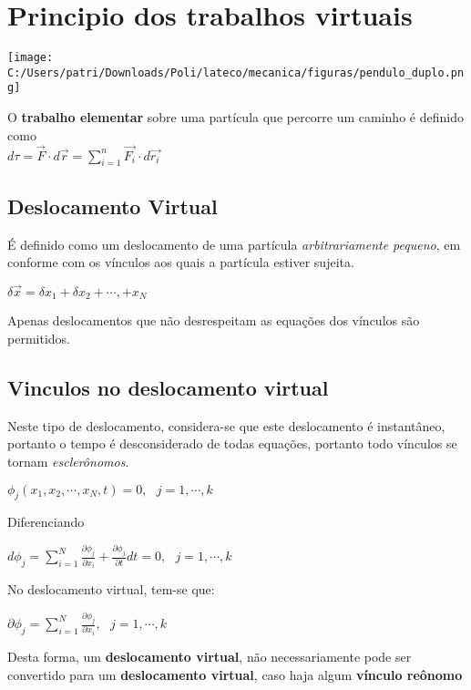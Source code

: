 \section{Principio dos trabalhos virtuais}

\begin{center}
\texttt{[image: C:/Users/patri/Downloads/Poli/lateco/mecanica/figuras/pendulo\_duplo.png]}
\end{center}

\begin{namedtheorem}
O \textbf{trabalho elementar} sobre uma partícula que percorre um caminho é definido como \\
$d\tau = \vec{F}\cdot d\vec{r} = \sum_{i=1}^n \vec{F_i}\cdot d\vec{r_i}$
\end{namedtheorem}

\subsection{Deslocamento Virtual}

É definido como um deslocamento de uma partícula \textit{arbitrariamente pequeno}, em conforme com os vínculos aos quais a partícula estiver sujeita. 

$\delta \vec{x} = \delta x_1 + \delta x_2 + \cdots, + x_N$

Apenas deslocamentos que não desrespeitam as equações dos vínculos são permitidos.


\subsection{Vinculos no deslocamento virtual}

Neste tipo de deslocamento, considera-se que este deslocamento é instantâneo, portanto o tempo é desconsiderado de todas equações, portanto todo vínculos se tornam \textit{esclerônomos}.

$\phi_j(x_1, x_2, \cdots, x_{N}, t) = 0, \textit{  } j =1, \cdots, k$

Diferenciando

$d \phi_j = \sum_{i=1}^{N} \frac{\partial \phi_j}{\partial x_i} + \frac{\partial \phi_j}{\partial t}dt = 0, \textit{  } j=1, \cdots, k$

No deslocamento virtual, tem-se que:

$\partial \phi_j = \sum_{i=1}^{N} \frac{\partial \phi_j}{\partial x_i}, \textit{  } j=1, \cdots, k$

Desta forma, um \textbf{deslocamento virtual}, não necessariamente pode ser convertido para um \textbf{deslocamento virtual}, caso haja algum \textbf{vínculo reônomo}

